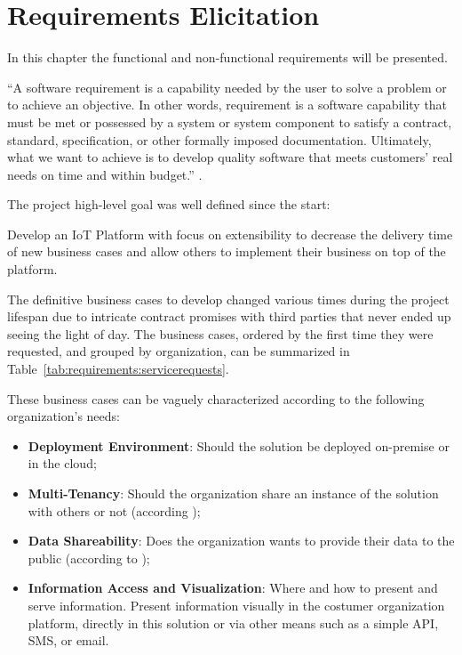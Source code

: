 \chapter{Requirements Elicitation}
\label{chap:requirements}

In this chapter the functional and non-functional requirements will be presented.

``A software requirement is a capability needed by the user to solve a problem or to achieve an objective. In other words, requirement is a software capability that must be met or possessed by a system or system component to satisfy a contract, standard, specification, or other formally imposed documentation. Ultimately, what we want to achieve is to develop quality software that meets customers' real needs on time and within budget.'' \parencite{req}.

The project high-level goal was well defined since the start:

Develop an IoT Platform with focus on extensibility to decrease the delivery time of new business cases and allow others to implement their business on top of the platform.

The definitive business cases to develop changed various times during the project lifespan due to intricate contract promises with third parties that never ended up seeing the light of day. The business cases, ordered by the first time they were requested, and grouped by organization, can be summarized in Table~\ref{tab:requirements:servicerequests}.

These business cases can be vaguely characterized according to the following organization's needs:

\begin{itemize}
    \item \textbf{Deployment Environment}: Should the solution be deployed on-premise or in the cloud;
    \item \textbf{Multi-Tenancy}: Should the organization share an instance of the solution with others or not (according \cite{multi});
    \item \textbf{Data Shareability}: Does the organization wants to provide their data to the public (according to \cite{pra2.2017.14505401085});
    \item \textbf{Information Access and Visualization}: Where and how to present and serve information. Present information visually in the costumer organization platform, directly in this solution or via other means such as a simple \gls{API}, SMS, or email.
\end{itemize}

